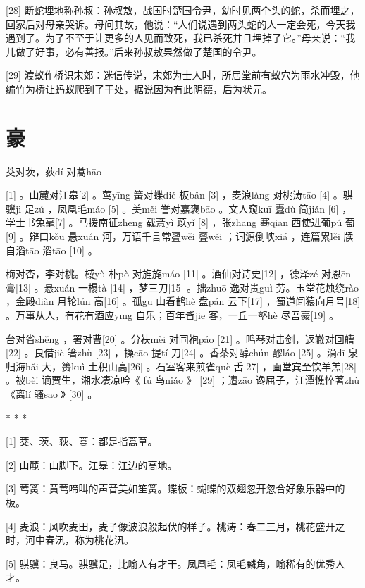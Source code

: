 \documentclass[12pt,UTF8]{ctexbook}
\begin{document}
[28] 断蛇埋地称孙叔：孙叔敖，战国时楚国令尹，幼时见两个头的蛇，杀而埋之，回家后对母亲哭诉。母问其故，他说：“人们说遇到两头蛇的人一定会死，今天我遇到了。为了不至于让更多的人见而致死，我已杀死并且埋掉了它。”母亲说：“我儿做了好事，必有善报。”后来孙叔敖果然做了楚国的令尹。

[29] 渡蚁作桥识宋郊：迷信传说，宋郊为士人时，所居堂前有蚁穴为雨水冲毁，他编竹为桥让蚂蚁爬到了干处，据说因为有此阴德，后为状元。





\chapter{豪}


茭对茨，荻dí 对蒿hāo





[1] 。山麓对江皋[2] 。莺yīng 簧对蝶dié 板bǎn [3] ，麦浪làng 对桃涛tāo [4] 。骐骥jì 足zú ，凤凰毛máo [5] 。美měi 誉对嘉褒bāo 。文人窥kuī 蠹dù 简jiǎn [6] ，学士书兔毫[7] 。马援南征zhēng 载薏yì 苡yǐ [8] ，张zhāng 骞qiān 西使进葡pú 萄[9] 。辩口kǒu 悬xuán 河，万语千言常亹wěi 亹wěi ；词源倒峡xiá ，连篇累lěi 牍自滔tāo 滔tāo [10] 。

梅对杏，李对桃。棫yù 朴pò 对旌旄máo [11] 。酒仙对诗史[12] ，德泽zé 对恩ēn 膏[13] 。悬xuán 一榻tà [14] ，梦三刀[15] 。拙zhuō 逸对贵guì 劳。玉堂花烛绕rào ，金殿diàn 月轮lún 高[16] 。孤gū 山看鹤hè 盘pán 云下[17] ，蜀道闻猿向月号[18] 。万事从人，有花有酒应yīng 自乐；百年皆jiē 客，一丘一壑hè 尽吾豪[19] 。

台对省shěng ，署对曹[20] 。分袂mèi 对同袍páo [21] 。鸣琴对击剑，返辙对回艚[22] 。良借jiè 箸zhù [23] ，操cāo 提tí 刀[24] 。香茶对醇chún 醪láo [25] 。滴dī 泉归海hǎi 大，篑kuì 土积山高[26] 。石室客来煎雀què 舌[27] ，画堂宾至饮羊羔[28] 。被bèi 谪贾生，湘水凄凉吟《 fú 鸟niǎo 》 [29] ；遭zāo 谗屈子，江潭憔悴著zhù 《离lí 骚sāo 》 [30] 。



* * *



[1] 茭、茨、荻、蒿：都是指蒿草。

[2] 山麓：山脚下。江皋：江边的高地。

[3] 莺簧：黄莺啼叫的声音美如笙簧。蝶板：蝴蝶的双翅忽开忽合好象乐器中的板。

[4] 麦浪：风吹麦田，麦子像波浪般起伏的样子。桃涛：春二三月，桃花盛开之时，河中春汛，称为桃花汛。

[5] 骐骥：良马。骐骥足，比喻人有才干。凤凰毛：凤毛麟角，喻稀有的优秀人才。
\end{document}
